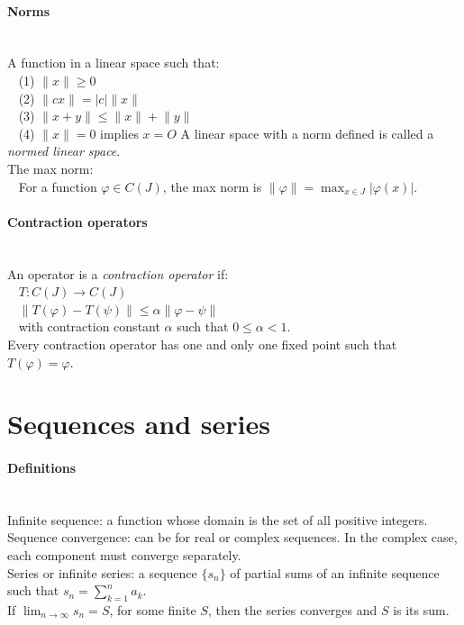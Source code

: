 \documentclass[10pt]{article}
\begin{document}
\paragraph{Norms}\ \\
A function in a linear space such that:\\
$\phantom{x}$ (1) $\lVert x \rVert \geq 0$\\
$\phantom{x}$ (2) $\lVert cx \rVert = |c| \lVert x \rVert$\\
$\phantom{x}$ (3) $\lVert x + y \rVert \leq \lVert x \rVert + \lVert y \rVert$\\
$\phantom{x}$ (4) $\lVert x \rVert = 0$ implies $x = O$
A linear space with a norm defined is called a {\it normed linear space}.\\
The max norm:\\
$\phantom{x}$ For a function $\varphi \in C(J)$, the max norm is $\lVert \varphi \rVert = \max_{x\in J} |\varphi(x)|$.

\paragraph{Contraction operators}\ \\
An operator is a {\it contraction operator} if:\\
$\phantom{x}$ $T: C(J) \to C(J)$\\
$\phantom{x}$ $\lVert T(\varphi) - T(\psi) \rVert \leq \alpha \lVert \varphi - \psi \rVert$\\
$\phantom{x}$ with contraction constant $\alpha$ such that $0 \leq \alpha < 1$.\\
Every contraction operator has one and only one fixed point such that $T(\varphi) = \varphi$.



\bigskip\bigskip
\section{Sequences and series}\smallskip

\paragraph{Definitions}\ \\
Infinite sequence: a function whose domain is the set of all positive integers.\\
Sequence convergence: can be for real or complex sequences. In the complex case, each component must converge separately.\\
Series or infinite series: a sequence $\{s_n\}$ of partial sums of an infinite sequence such that $s_n = \sum_{k=1}^n a_k$.\\
If $\lim_{n \to \infty} s_n = S$, for some finite $S$, then the series converges and $S$ is its sum.
\end{document}
